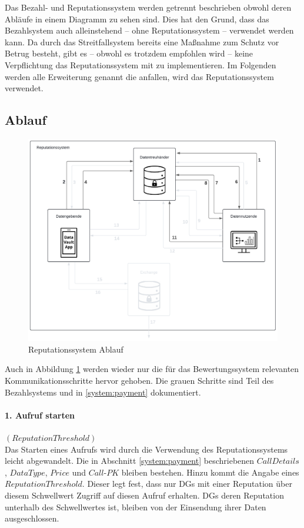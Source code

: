 \documentclass[
	fontsize=11pt,
	headings=small,
	parskip=half,           %
	bibliography=totoc,
	numbers=noenddot,       %
	open=any,               %
]{scrreprt}
\begin{document}
Das Bezahl- und Reputationssystem werden getrennt beschrieben obwohl deren Abläufe in einem Diagramm zu sehen sind. Dies hat den Grund, dass das Bezahlsystem auch alleinstehend -- ohne Reputationssystem -- verwendet werden kann. Da durch das Streitfallsystem bereits eine Maßnahme zum Schutz vor Betrug besteht, gibt es -- obwohl es trotzdem empfohlen wird -- keine Verpflichtung das Reputationssystem mit zu implementieren. Im Folgenden werden alle Erweiterung genannt die anfallen, wird das Reputationssystem verwendet.
\subsection{Ablauf}
\begin{figure}[h]
    \centering
    \includegraphics[width=0.9\linewidth]{ReputationDiagramm.pdf}
    \caption{Reputationssystem Ablauf}
    \label{fig:reputation}
\end{figure}

Auch in Abbildung \ref{fig:reputation} werden wieder nur die für das Bewertungssystem relevanten Kommunikationsschritte hervor gehoben. Die grauen Schritte sind Teil des Bezahlsystems und in \ref{system:payment} dokumentiert.

\paragraph{1. Aufruf starten} $(ReputationThreshold)$\\
Das Starten eines Aufrufs wird durch die Verwendung des Reputationssystems leicht abgewandelt. Die in Abschnitt \ref{system:payment} beschriebenen $CallDetails$, $DataType$, $Price$ und $Call$-$PK$ bleiben bestehen. Hinzu kommt die Angabe eines $ReputationThreshold$. Dieser legt fest, dass nur DGs mit einer Reputation über diesem Schwellwert Zugriff auf diesen Aufruf erhalten. DGs deren Reputation unterhalb des Schwellwertes ist, bleiben von der Einsendung ihrer Daten ausgeschlossen.
\end{document}

